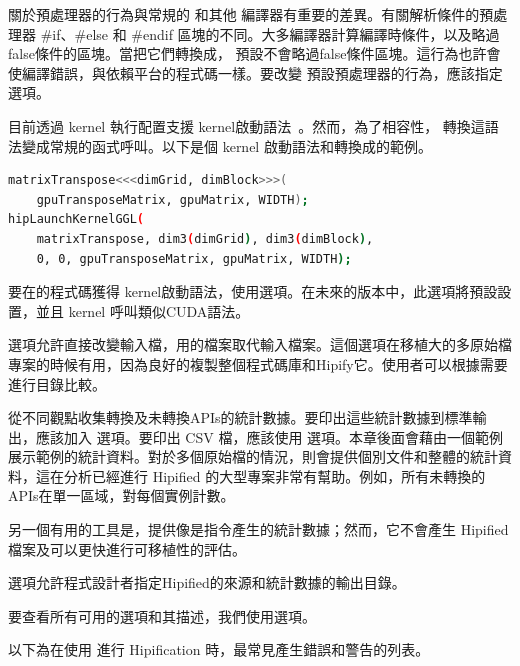  關於預處理器的行為與常規的  和其他  編譯器有重要的差異。有關解析條件的預處理器 #if、#else 和 #endif 區塊的不同。大多編譯器計算編譯時條件，以及略過false條件的區塊。當把它們轉換成， 預設不會略過false條件區塊。這行為也許會使編譯錯誤，與依賴平台的程式碼一樣。要改變  預設預處理器的行為，應該指定  選項。

目前透過 kernel 執行配置支援  kernel啟動語法~\cite{CUDA-Kernel-Execution-Configuration}。然而，為了相容性， 轉換這語法變成常規的函式呼叫。以下是個  kernel 啟動語法和轉換成的範例。

\begin{lstlisting}[language=bash]
matrixTranspose<<<dimGrid, dimBlock>>>(
    gpuTransposeMatrix, gpuMatrix, WIDTH);
hipLaunchKernelGGL(
    matrixTranspose, dim3(dimGrid), dim3(dimBlock),
    0, 0, gpuTransposeMatrix, gpuMatrix, WIDTH);
\end{lstlisting}

要在的程式碼獲得 kernel啟動語法，使用選項。在未來的版本中，此選項將預設設置，並且 kernel 呼叫類似CUDA語法。

選項允許直接改變輸入檔，用的檔案取代輸入檔案。這個選項在移植大的多原始檔專案的時候有用，因為良好的複製整個程式碼庫和Hipify它。使用者可以根據需要進行目錄比較。

 從不同觀點收集轉換及未轉換APIs的統計數據。要印出這些統計數據到標準輸出，應該加入  選項。要印出 CSV 檔，應該使用  選項。本章後面會藉由一個範例展示範例的統計資料。對於多個原始檔的情況，則會提供個別文件和整體的統計資料，這在分析已經進行 Hipified 的大型專案非常有幫助。例如，所有未轉換的APIs在單一區域，對每個實例計數。

另一個有用的工具是，提供像是指令產生的統計數據；然而，它不會產生 Hipified 檔案及可以更快進行可移植性的評估。

選項允許程式設計者指定Hipified的來源和統計數據的輸出目錄。

要查看所有可用的選項和其描述，我們使用選項。

以下為在使用 進行 Hipification 時，最常見產生錯誤和警告的列表。

